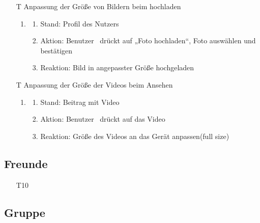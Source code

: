 \documentclass[parskip=full]{scrartcl}
\begin{document}
\begin{itemize}
\item[T] Anpassung der Größe von Bildern beim hochladen
\begin{enumerate}
	\item
	\begin{enumerate}[nosep]	
	\item Stand:  Profil des Nutzers
	\item Aktion: Benutzer  drückt auf „Foto hochladen“, Foto auswählen und bestätigen
	\item Reaktion: Bild in angepasster Größe hochgeladen
\end{enumerate} 
\end{enumerate}

\item[T] Anpassung der Größe der Videos beim Ansehen
\begin{enumerate}
	\item
	\begin{enumerate}[nosep]	
	\item Stand:  Beitrag mit Video
	\item Aktion: Benutzer  drückt auf das Video
	\item Reaktion: Größe des Videos an das Gerät anpassen(full size)
\end{enumerate} 
\end{enumerate}
	
		\end{itemize}
		
	\subsection{Freunde}
		
		\begin{itemize}
			\item[T10]
		\end{itemize}
	
	
	\subsection{Gruppe}
	
\end{document}
